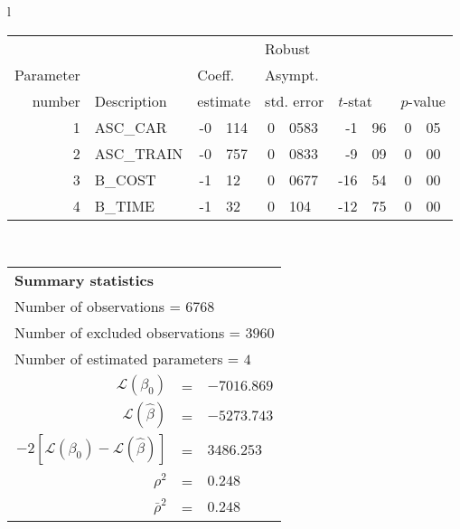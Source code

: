   \begin{tabular}{l}
\begin{tabular}{rlr@{.}lr@{.}lr@{.}lr@{.}l}
         &                       &   \multicolumn{2}{l}{}    & \multicolumn{2}{l}{Robust}  &     \multicolumn{4}{l}{}   \\
Parameter &                       &   \multicolumn{2}{l}{Coeff.}      & \multicolumn{2}{l}{Asympt.}  &     \multicolumn{4}{l}{}   \\
number &  Description                     &   \multicolumn{2}{l}{estimate}      & \multicolumn{2}{l}{std. error}  &   \multicolumn{2}{l}{$t$-stat}  &   \multicolumn{2}{l}{$p$-value}   \\

\hline

1 & ASC_CAR & -0&114 & 0&0583 & -1&96 & 0&05\\
2 & ASC_TRAIN & -0&757 & 0&0833 & -9&09 & 0&00\\
3 & B_COST & -1&12 & 0&0677 & -16&54 & 0&00\\
4 & B_TIME & -1&32 & 0&104 & -12&75 & 0&00\\
\hline
\end{tabular}
\\
\begin{tabular}{rcl}
\multicolumn{3}{l}{\bf Summary statistics}\\
\multicolumn{3}{l}{ Number of observations = $6768$} \\
\multicolumn{3}{l}{ Number of excluded observations = $3960$} \\
\multicolumn{3}{l}{ Number of estimated  parameters = $4$} \\
 $\mathcal{L}(\beta_0)$ &=&  $-7016.869$ \\
 $\mathcal{L}(\hat{\beta})$ &=& $-5273.743 $  \\
 $-2[\mathcal{L}(\beta_0) -\mathcal{L}(\hat{\beta})]$ &=& $3486.253$ \\
    $\rho^2$ &=&   $0.248$ \\
    $\bar{\rho}^2$ &=&    $0.248$ \\
\end{tabular}
  \end{tabular}

